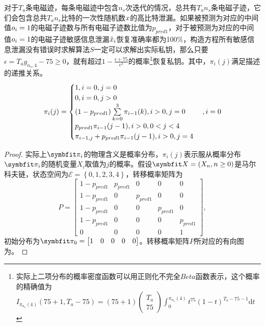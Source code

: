 {	\begin{proposition}\label{prop:highalpha}
		对于$T_a$条电磁迹，每条电磁迹中包含$n_s$次迭代的情况，总共有$T_an_s$条电磁子迹，它们会包含总共$T_an_s$比特的一次性随机数$x$的高比特泄漏。如果被预测为对应的中间值$o_i=1$的电磁子迹数与所有电磁子迹数比值为$p_{pred1}$，对于被预测为对应的中间值$o_i=1$的电磁子迹敏感信息泄漏$\tilde {x}_i$恢复准确率都为100\%，构造方程所有敏感信息泄漏没有错误时求解算法$S$一定可以求解出实际私钥，那么只要$\epsilon=T_ag_{n_s,4}-75\ge0$，就有超过$1-\frac{\epsilon+75}{\epsilon^2}$的概率\footnote{实际上二项分布的概率密度函数可以用正则化不完全$Beta$函数表示，这个概率的精确值为$I_{\pi_{n_s}(4)}(75+1,T_a-75)=(75+1)\begin{pmatrix}T_a\\75\end{pmatrix}\int_0^{\pi_{n_s}(4)}t^{75}(1-t)^{T_a-75-1}\mathrm dt$}恢复私钥。其中，$\pi_{i}(j)$满足描述的递推关系。
		\begin{equation}\label{eq:recursion}
			\pi_{i}(j)=\begin{cases}
				1,i=0,j=0\\
				0,i=0,j>0\\
				(1-p_{pred1})\sum\limits_{k=0}^{3}\pi_{i-1}(k),i>0,j=0\\
				p_{pred1}\pi_{i-1}(j-1),i>0,0<j<4\\
				\pi_{i-1,j}+p_{pred1}\pi_{i-1}(j-1),i>0,j=4
			\end{cases},i=0\\
		\end{equation}
	\end{proposition}
	\begin{proof}
	实际上$\Vector{\pi_i}$的物理含义是概率分布，$\pi_i(j)$表示服从概率分布$\Vector\pi_i$的随机变量$X_i$取值为$j$的概率。假设$\Vector X=(X_n,n\ge0)$是马尔科夫链，状态空间为$\mathcal E=\left\lbrace 0,1,2,3,4\right\rbrace $，转移概率矩阵为$$P=\begin{bmatrix}
	1-p_{pred1}&p_{pred1}&0&0&0\\
	1-p_{pred1}&0&p_{pred1}&0&0\\
	1-p_{pred1}&0&0&p_{pred1}&0\\
	1-p_{pred1}&0&0&0&p_{pred1}\\
	0&0&0&0&1
	\end{bmatrix},$$初始分布为$\Vector\pi_0=\begin{bmatrix}
	1&0&0&0&0
	\end{bmatrix}$。转移概率矩阵$P$所对应的有向图为。
	

\end{proof}}
